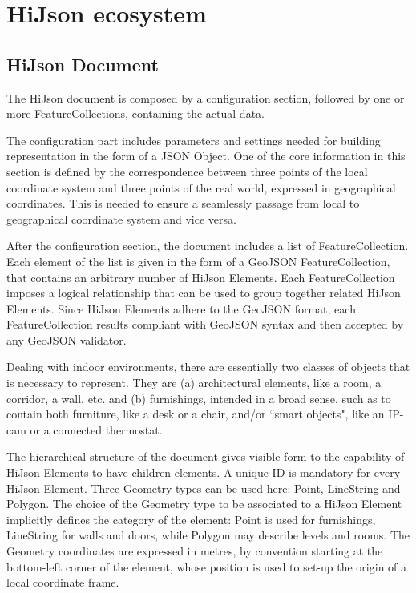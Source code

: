 \documentclass{sig-alternate}
\begin{document}
\section{HiJson ecosystem}


\subsection{HiJson Document}

The HiJson document is composed by a configuration section, followed by one or more FeatureCollections, containing the actual data.


The configuration part includes parameters and settings needed for building representation in the form of a JSON Object. One of the core information in this section is defined by the correspondence between three points of the local coordinate system and three points of the real world, expressed in geographical coordinates. This is needed to ensure a seamlessly passage from local to geographical coordinate system and vice versa.

After the configuration section, the document includes a list of FeatureCollection. 
Each element of the list is given in the form of a GeoJSON FeatureCollection, that contains an arbitrary number of HiJson Elements. Each FeatureCollection imposes a logical relationship that can be used to group together related HiJson Elements. Since HiJson Elements adhere to the GeoJSON format, each FeatureCollection results compliant with GeoJSON syntax and then accepted by any GeoJSON validator. 

Dealing with indoor environments, there are essentially two classes of objects that is necessary to represent. They are (a) architectural elements, like a room, a corridor, a wall, etc. and (b) furnishings, intended in a broad sense, such as to contain both furniture, like a desk or a chair, and/or ``smart objects", like an IP-cam or a connected thermostat.

The hierarchical structure of the document gives visible form to the capability of HiJson Elements to have children elements. A unique ID is mandatory for every HiJson Element.
Three Geometry types can be used here: Point, LineString and Polygon. The choice of the Geometry type to be associated to a HiJson Element implicitly defines the category of the element: Point is used for furnishings, LineString for walls and doors, while Polygon may describe levels and rooms.
The Geometry coordinates are expressed in metres, by convention starting at the bottom-left corner of the element, whose position is used to set-up the origin of a local coordinate frame. 
\end{document}
